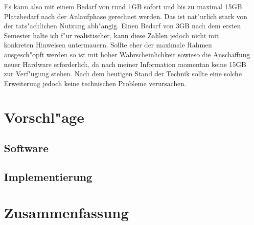 \documentclass[12pt,a4paper]{article}
\begin{document}
Es kann also mit einem Bedarf von rund 1GB sofort und bis zu maximal 15GB
Platzbedarf nach der Anlaufphase gerechnet werden. Das ist nat"urlich stark
von der tats"achlichen Nutzung abh"angig. Einen Bedarf von 3GB nach dem
ersten Semester halte ich f"ur realistischer, kann diese Zahlen jedoch
nicht mit konkreten Hinweisen untermauern. Sollte eher der maximale Rahmen
ausgesch"opft werden so ist mit hoher Wahrscheinlichkeit sowieso die
Anschaffung neuer Hardware erforderlich, da nach meiner Information
momentan keine 15GB zur Verf"ugung stehen. Nach dem heutigen Stand der
Technik sollte eine solche Erweiterung jedoch keine technischen Probleme
verursachen.

\section{Vorschl"age}

\subsection{Software}

\subsection{Implementierung}

\section{Zusammenfassung}
\end{document}
